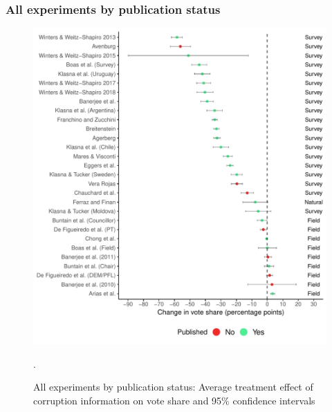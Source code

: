 \documentclass[usenames,dvipsnames]{beamer}
\begin{document}
\begin{frame}[label=all_published]
\frametitle{All experiments by publication status \hyperlink{pub_bias}{}}

\begin{figure}[!htb]
\begin{centering}
\vspace{-0.2cm}
\includegraphics[scale=0.51]{../figs/published.pdf}
\caption{All experiments by publication status: Average treatment effect of corruption information on vote share and 95\% confidence intervals}.
\label{fig: funnel_re_survey}
\end{centering}
\end{figure}

\end{frame}

\end{document}
